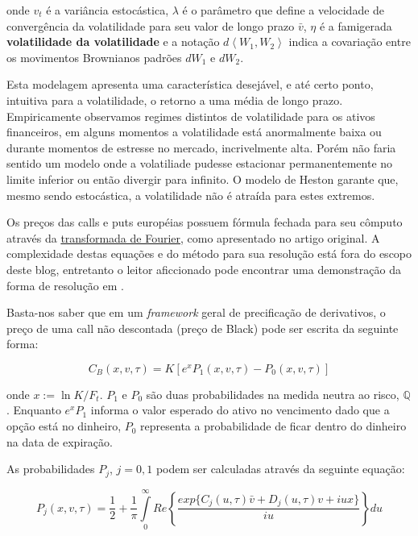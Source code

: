 \documentclass[]{book}
\theoremstyle{definition}
\theoremstyle{definition}
\theoremstyle{definition}
\theoremstyle{remark}
\begin{document}
onde \(v_t\) é a variância estocástica, \(\lambda\) é o parâmetro que define a velocidade de convergência da volatilidade para seu valor de longo prazo \(\bar v\), \(\eta\) é a famigerada \textbf{volatilidade da volatilidade} e a notação \(d\left\langle W_1, W_2 \right\rangle\) indica a covariação entre os movimentos Brownianos padrões \(dW_1\) e \(dW_2\).

Esta modelagem apresenta uma característica desejável, e até certo ponto, intuitiva para a volatilidade, o retorno a uma média de longo prazo. Empiricamente observamos regimes distintos de volatilidade para os ativos financeiros, em alguns momentos a volatilidade está anormalmente baixa ou durante momentos de estresse no mercado, incrivelmente alta. Porém não faria sentido um modelo onde a volatiliade pudesse estacionar permanentemente no limite inferior ou então divergir para infinito. O modelo de Heston garante que, mesmo sendo estocástica, a volatilidade não é atraída para estes extremos.

Os preços das calls e puts européias possuem fórmula fechada para seu cômputo através da \href{https://en.wikipedia.org/wiki/Fourier_transform}{transformada de Fourier}, como apresentado no artigo original. A complexidade destas equações e do método para sua resolução está fora do escopo deste blog, entretanto o leitor aficcionado pode encontrar uma demonstração da forma de resolução em \citet{Gatheral2011}.

Basta-nos saber que em um \emph{framework} geral de precificação de derivativos, o preço de uma call não descontada (preço de Black) pode ser escrita da seguinte forma:

\begin{equation}
C_B(x, v, \tau)=K\left[e^xP_1(x, v, \tau)-P_0(x, v, \tau)\right]
\label{eq:callgeral}
\end{equation}

onde \(x:=\ln K/F_t\). \(P_1\) e \(P_0\) são duas probabilidades na medida neutra ao risco, \(\mathbb Q\). Enquanto \(e^xP_1\) informa o valor esperado do ativo no vencimento dado que a opção está no dinheiro, \(P_0\) representa a probabilidade de ficar dentro do dinheiro na data de expiração.

As probabilidades \(P_j\), \(j = 0, 1\) podem ser calculadas através da seguinte equação:

\begin{equation}
P_j(x, v, \tau)=\frac{1}{2}+\frac{1}{\pi}\int\limits_0^\infty
    Re\left\lbrace\frac{exp\{C_j(u, \tau)\bar v + D_j(u, \tau)v + iux\}}{iu}\right\rbrace du
\label{eq:pj}
\end{equation}
\end{document}
